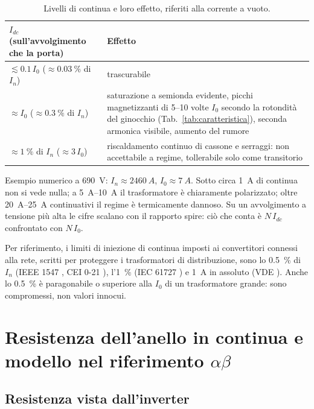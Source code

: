 \documentclass[10pt,a4paper]{scrartcl}
\newcommand{\Idc}{I_{dc}}
\newcommand{\Izero}{I_0}
\begin{document}
\begin{onehalfspace}
\begin{table}[H]
\centering\small
\begin{tabular}{@{}R{5.2cm}R{10.3cm}@{}}
\toprule
\textbf{$\Idc$ (sull'avvolgimento che la porta)} & \textbf{Effetto} \\
\midrule
$\lesssim \num{0.1}\,\Izero$ ($\approx \SI{0.03}{\percent}$ di $I_n$) & trascurabile \\
$\approx \Izero$ ($\approx \SI{0.3}{\percent}$ di $I_n$) & saturazione a semionda evidente, picchi magnetizzanti di \numrange{5}{10} volte $\Izero$ secondo la rotondità del ginocchio (Tab.~\ref{tab:caratteristica}), seconda armonica visibile, aumento del rumore \\
$\approx \SI{1}{\percent}$ di $I_n$ ($\approx 3\,\Izero$) & riscaldamento continuo di cassone e serraggi: non accettabile a regime, tollerabile solo come transitorio \\
\bottomrule
\end{tabular}
\caption{Livelli di continua e loro effetto, riferiti alla corrente a vuoto.}
\label{tab:limiti}
\end{table}

Esempio numerico a \SI{690}{V}: $I_n \approx \SI{2460}{A}$, $\Izero \approx \SI{7}{A}$. Sotto circa \SI{1}{A} di continua non si vede nulla; a \SIrange{5}{10}{A} il trasformatore è chiaramente polarizzato; oltre \SIrange{20}{25}{A} continuativi il regime è termicamente dannoso. Su un avvolgimento a tensione più alta le cifre scalano con il rapporto spire: ciò che conta è $N\,\Idc$ confrontato con $N\,\Izero$.

Per riferimento, i limiti di iniezione di continua imposti ai convertitori connessi alla rete, scritti per proteggere i trasformatori di distribuzione, sono lo \SI{0.5}{\percent} di $I_n$ (IEEE 1547 \cite{ieee1547}, CEI 0-21 \cite{cei021}), l'\SI{1}{\percent} (IEC 61727 \cite{iec61727}) e \SI{1}{A} in assoluto (VDE \cite{vde0126}). Anche lo \SI{0.5}{\percent} è paragonabile o superiore alla $\Izero$ di un trasformatore grande: sono compromessi, non valori innocui.

\section{Resistenza dell'anello in continua e modello nel riferimento \texorpdfstring{$\alpha\beta$}{alfa-beta}}
\label{sec:resistenza}

\subsection{Resistenza vista dall'inverter}


\end{onehalfspace}
\end{document}
